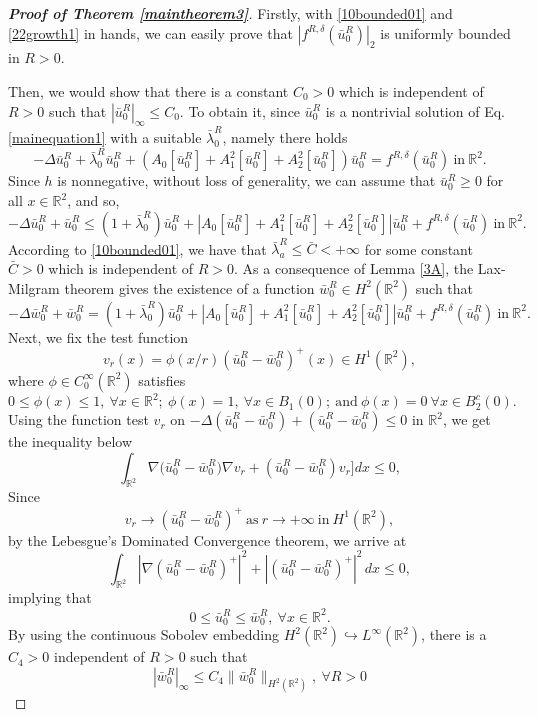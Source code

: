 \documentclass[11pt]{amsart}
\numberwithin{equation}{section}
\theoremstyle{definition}
\newcommand{\R}{\mathbb{R}}
\begin{document}
\begin{proof}[\emph{\textbf{Proof of Theorem \ref{maintheorem3}}}]
Firstly, with \eqref{10bounded01} and \eqref{22growth1} in hands,
we can easily prove that $|f^{R,\delta}(\bar{u}_0^R)|_2$
is uniformly bounded in $R>0$.

Then, we would show that there is a constant $C_0>0$ which is independent of $R>0$
such that $|\bar{u}_0^R|_\infty\leq C_0$.
To obtain it, since
 $\bar{u}_0^R$ is a nontrivial solution of Eq. \eqref{mainequation1} with a suitable $\bar{\lambda}_0^R$, namely there holds
$$
 -\Delta \bar{u}_0^R +\bar{\lambda}_0^R\bar{u}_0^R
 +(A_0[\bar{u}_0^R]+A_1^2[\bar{u}_0^R]+A_2^2[\bar{u}_0^R])\bar{u}_0^R=f^{R,\delta}(\bar{u}_0^R) ~ \mbox{in}~ \R^2.
 $$
Since $h$ is nonnegative, without loss of generality, we can assume that $\bar{u}_0^R\geq0$ for all $x\in\R^2$,
and so,
$$
 -\Delta \bar{u}_0^R + \bar{u}_0^R\leq (1+\bar{\lambda}_0^R)\bar{u}_0^R
 + |A_0[\bar{u}_0^R]+A_1^2[\bar{u}_0^R]+A_2^2[\bar{u}_0^R]|\bar{u}_0^R+ f^{R,\delta}(\bar{u}_0^R) ~ \mbox{in}~ \R^2.
 $$
According to \eqref{10bounded01}, we have that $\bar{\lambda}_a^R\leq \bar{C}<+\infty$
for some constant $\bar{C}>0$ which is independent of $R>0$.
As a consequence  of Lemma \ref{3A}, the Lax-Milgram
theorem gives the existence of a function $\bar{w}_0^R\in H^{2}(\R^2)$ such that
$$
 -\Delta \bar{w}_0^R+\bar{w}_0^R=(1+\bar{\lambda}_0^R)\bar{u}_0^R
 + |A_0[\bar{u}_0^R]+A_1^2[\bar{u}_0^R]+A_2^2[\bar{u}_0^R]|\bar{u}_0^R+ f^{R,\delta}(\bar{u}_0^R) ~ \mbox{in} ~ \R^2.
 $$
Next, we fix the test function
 $$
 v_r(x)=\phi(x/r)(\bar{u}_0^R-\bar{w}_0^R)^{+}(x) \in H^{1}(\R^2),
 $$
 where $\phi \in C_{0}^{\infty}(\R^2)$ satisfies
 $$
 0 \leq \phi(x) \leq 1,~\forall x \in \R^2;~\phi(x)=1, ~ \forall x \in B_1(0); ~\mbox{and}~\phi(x)=0~\forall x \in B^{c}_{2}(0).
 $$
Using the function test $v_r$
 on $-\Delta(\bar{u}_0^R-\bar{w}_0^R)+(\bar{u}_0^R-\bar{w}_0^R)\leq0$ in $\R^2$, we get the inequality below
 $$
 \int_{\R^2}\nabla\big(\bar{u}_0^R-\bar{w}_0^R)\nabla v_r + (\bar{u}_0^R-\bar{w}_0^R)v_r\big] dx \leq 0,
 $$
Since
$$
v_r \to (\bar{u}_0^R-\bar{w}_0^R)^+ ~\mbox{as} ~ r \to +\infty ~\mbox{in} ~H^1(\R^2),
$$
by the Lebesgue's Dominated Convergence theorem,
we arrive at
$$
 \int_{\R^2}|\nabla (\bar{u}_0^R-\bar{w}_0^R)^+|^2+|(\bar{u}_0^R-\bar{w}_0^R)^+|^2  \,dx \leq 0,
$$
implying that
\[
0\leq \bar{u}_0^R\leq \bar{w}_0^R,~ \forall x \in \R^2.
\]
By using the continuous Sobolev embedding $H^2(\R^2) \hookrightarrow L^{\infty}(\R^2)$, there is a $C_4>0$ independent of $R>0$ such that
$$
|\bar{w}_0^R|_\infty \leq C_4\|\bar{w}_0^R\|_{H^{2}(\R^2)}, ~\forall R>0
$$
\end{proof}
\end{document}
